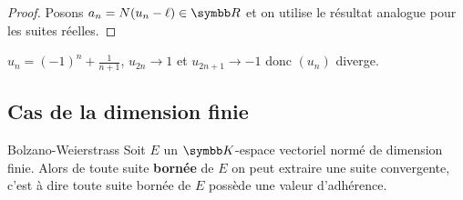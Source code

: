\begin{proof}
    Posons $a_n = N(u_n - \ell) \in \R$ et on utilise le résultat analogue pour les suites réelles.
\end{proof}

\begin{exemple}
    $u_n = (-1)^n + \frac 1 {n+1}$, $u_{2n} \to 1$ et $u_{2n + 1} \to -1$ donc $(u_n)$ diverge.
\end{exemple}

\subsection{Cas de la dimension finie}

\begin{theoreme}{Bolzano-Weierstrass}{}
    Soit $E$ un $\K$-espace vectoriel normé de dimension finie. Alors de toute suite
    \textbf{bornée} de $E$ on peut extraire une suite convergente, c'est à dire toute 
    suite bornée de $E$ possède une valeur d'adhérence. 
\end{theoreme}



